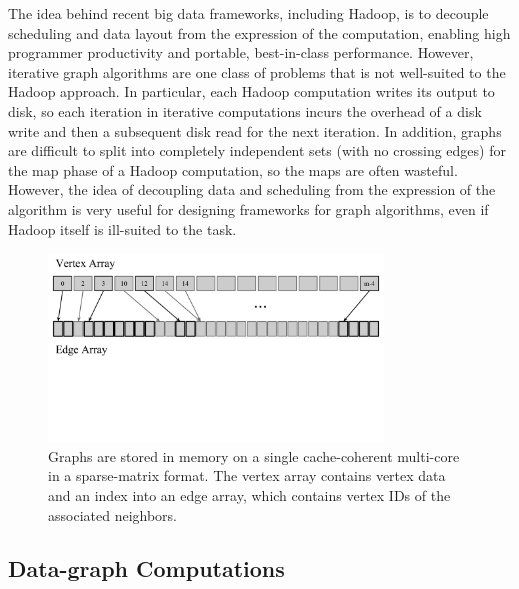 The idea behind recent big data frameworks, including Hadoop, 
is to decouple scheduling and
data layout from the expression of the computation, enabling high
programmer productivity and portable, best-in-class performance.
However, iterative graph algorithms are one class of problems that
is not well-suited to the Hadoop approach. In particular, each 
Hadoop computation writes its output to disk, so each iteration 
in iterative computations incurs the overhead of a disk write 
and then a subsequent disk read for the next iteration. In 
addition, graphs are difficult to split into completely 
independent sets (with no crossing edges) for the map phase 
of a Hadoop computation, so the maps are often wasteful.
However, the idea of decoupling data and scheduling from the expression of
the algorithm is very useful for designing frameworks
for graph algorithms, even if Hadoop itself is ill-suited to 
the task.  




\begin{figure}[!h]
\centering
\includegraphics[keepaspectratio,width=3.5in,clip,trim=0 5cm 0 0]{figures/sparse_matrix_representation.pdf}
\caption{Graphs are stored in memory on a single cache-coherent
multi-core in a sparse-matrix format.  The vertex array contains
vertex data and an index into an edge array, which contains vertex
IDs of the associated neighbors.}
\label{fig:layout}
\end{figure}



\subsection{Data-graph Computations}

